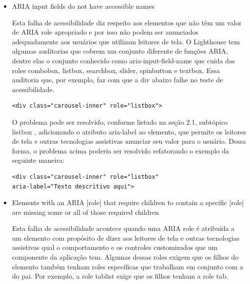 \documentclass[
	12pt,				%
	openright,			%
	oneside,			%
	a4paper,			%
	chapter=TITLE,		%
	section=TITLE,		%
	subsection=TITLE,	%
	subsubsection=TITLE,%
	english,			%
	brazil				%
	]{abntex2}
\theoremstyle{definition}
\begin{document}
\begin{itemize}

    \item ARIA input fields do not have accessible names
    
Esta falha de acessibilidade diz respeito aos elementos que não têm um valor de ARIA role apropriado e por isso não podem ser anunciados adequadamente aos usuários que utilizam leitores de tela. O Lighthouse tem algumas auditorias que cobrem um conjunto diferente de funções ARIA, dentre elas o conjunto conhecido como aria-input-field-name que cuida das roles combobox, listbox, searchbox, slider, spinbutton e textbox. Essa auditoria que, por exemplo, faz com que a div abaixo falhe no teste de acessibilidade.

\begin{center}
\begin{minipage}{10cm}
\begin{verbatim}
<div class="carousel-inner" role="listbox">
\end{verbatim}
\end{minipage}
\end{center}

O problema pode ser resolvido, conforme listado na seção 2.1, subtópico listbox \cite{world2014accessible}, adicionando o atributo aria-label ao elemento, que permite os leitores de tela e outras tecnologias assistivas anunciar seu valor para o usuário. Dessa forma, o problema acima poderia ser resolvido refatorando o exemplo da seguinte maneira:

\begin{center}
\begin{minipage}{10cm}
\begin{verbatim}
<div class="carousel-inner" role="listbox"
aria-label="Texto descritivo aqui">
\end{verbatim}
\end{minipage}
\end{center}
    
\pagebreak
    
    \item Elements with an ARIA [role] that require children to contain a specific [role] are missing some or all of those required children
    
Esta falha de acessibilidade acontece quando uma ARIA role é atribuída a um elemento com propósito de dizer aos leitores de tela e outras tecnologias assistivas qual o comportamento e os controles customizados que um componente da aplicação tem. Algumas dessas roles exigem que os filhos do elemento também tenham roles específicas que trabalham em conjunto com a do pai. Por exemplo, a role tablist exige que os filhos tenham a role tab.


\end{itemize}
\end{document}
